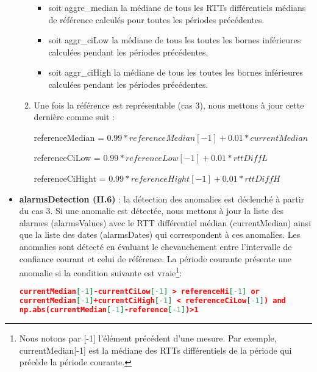 \begin{itemize}
\begin{enumerate}
\begin{itemize}
\item  soit aggre\_median la médiane de tous les RTTs différentiels médians de référence calculés pour toutes les périodes précédentes. 
	
\item 	soit aggr\_ciLow la médiane de tous les   toutes les bornes inférieures calculées pendant les périodes précédentes.
	
\item 	soit aggr\_ciHigh la médiane de tous les   toutes les bornes inférieures calculées pendant les périodes précédentes.

\end{itemize}

	
	\item Une fois la référence est représentable (cas 3), nous mettons à jour cette dernière comme suit :
	
		referenceMedian = $  0.99*referenceMedian[-1]+0.01*currentMedian $
	
		 referenceCiLow =	$ 0.99*referenceLow[-1]+0.01*rttDiffL $
		 
	referenceCiHight = $ 0.99*referenceHight[-1]+0.01*rttDiffH $
	

	   
	

\end{enumerate}
 \item \textbf{ alarmsDetection (II.6) }:   la détection des anomalies est déclenché à partir du cas 3. Si une anomalie est détectée, nous mettons à jour la liste des alarmes  {\color{gray}(alarmsValues)} avec le RTT différentiel médian (currentMedian) ainsi que la
 liste des dates  {\color{gray}(alarmsDates)} qui correspondent à ces anomalies. Les anomalies sont détecté en évaluant le chevauchement entre l'intervalle de confiance courant et celui de référence. La période courante présente une anomalie si la condition suivante est vraie\footnote{Nous notons par [-1] l'élément précédent d'une mesure. Par exemple, currentMedian[-1] est la médiane des RTTs différentiels de la période qui précède la période courante.}:
 \begin{lstlisting}[language=json,firstnumber=1, caption={Illustration},
 basicstyle =\footnotesize]
currentMedian[-1]-currentCiLow[-1] > referenceHi[-1] or
currentMedian[-1]+currentCiHigh[-1] < referenceCiLow[-1]) and
np.abs(currentMedian[-1]-reference[-1])>1
 \end{lstlisting}

 
 
  \end{itemize}

